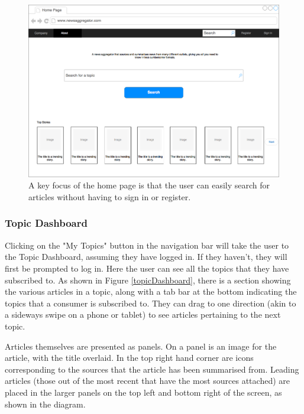 \documentclass[12pt]{article}
\begin{document}
\begin{figure}[ht!]
  \centering
    \includegraphics[scale=0.3]{HomePage.png}
   \caption[A wireframe of the Home Screen]{A key focus of the home page is that the user can easily search for articles without having to sign in or register.}
   \label{homePage}
\end{figure}

\subsubsection{Topic Dashboard}

Clicking on the "My Topics" button in the navigation bar will take the user to the Topic Dashboard, assuming they have logged in. If they haven't, they will first be prompted to log in. Here the user can see all the topics that they have subscribed to. As shown in Figure \ref{topicDashboard}, there is a section showing the various articles in a topic, along with a tab bar at the bottom indicating the topics that a consumer is subscribed to. They can drag to one direction (akin to a sideways swipe on a phone or tablet) to see articles pertaining to the next topic. 

Articles themselves are presented as panels. On a panel is an image for the article, with the title overlaid. In the top right hand corner are icons corresponding to the sources that the article has been summarised from. Leading articles (those out of the most recent that have the most sources attached) are placed in the larger panels on the top left and bottom right of the screen, as shown in the diagram.

\label{topicdashboard}
\end{document}
